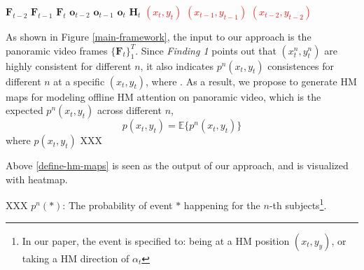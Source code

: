 \documentclass[10pt,journal,compsoc]{IEEEtran}
\begin{document}
$\mathbf{F}_{t-2}$
$\mathbf{F}_{t-1}$
$\mathbf{F}_{t}$
$\mathbf{o}_{t-2}$
$\mathbf{o}_{t-1}$
$\mathbf{o}_{t}$
$\mathbf{H}_{t}$
\textcolor{red}{$(x_t, y_t)$}
\textcolor{red}{$(x_{t-1}, y_{t-1})$}
\textcolor{red}{$(x_{t-2}, y_{t-2})$}

As shown in Figure \ref{main-framework}, the input to our approach is the panoramic video frames $\{\mathbf{F}_t\}_1^{T}$.
Since \textit{Finding 1} points out that $(x^n_t, y^n_t)$ are highly consistent for different $n$, it also indicates $p^n(x_t,y_t)$ consistences for different $n$ at a specific $(x_t,y_t)$, where . As a result, we propose to generate HM maps for modeling offline HM attention on panoramic video, which is the expected $p^n(x_t,y_t)$ across different $n$,
 \begin{equation}\label{define-hm-maps}
   p(x_t,y_t) = \mathbb{E}\{ p^n(x_t, y_t) \}
 \end{equation}
where $p(x_t,y_t)$ XXX

 Above \eqref{define-hm-maps} is seen as the output of our approach, and is visualized with heatmap.

XXX $p^n(\ast)$: The probability of event $\ast$ happening for the $n$-th subjects\footnote{In our paper, the event is specified to: being at a HM position $(x_t,y_y)$, or taking a HM direction of $\alpha_t$}.
\end{document}
